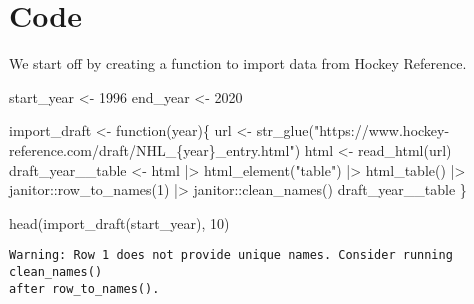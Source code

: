 \documentclass[
  letterpaper,
  DIV=11,
  numbers=noendperiod]{scrreprt}
\newenvironment{Shaded}{\begin{snugshade}}{\end{snugshade}}
\newcommand{\ControlFlowTok}[1]{\textcolor[rgb]{0.00,0.23,0.31}{#1}}
\newcommand{\DecValTok}[1]{\textcolor[rgb]{0.68,0.00,0.00}{#1}}
\newcommand{\FunctionTok}[1]{\textcolor[rgb]{0.28,0.35,0.67}{#1}}
\newcommand{\NormalTok}[1]{\textcolor[rgb]{0.00,0.23,0.31}{#1}}
\newcommand{\OtherTok}[1]{\textcolor[rgb]{0.00,0.23,0.31}{#1}}
\newcommand{\SpecialCharTok}[1]{\textcolor[rgb]{0.37,0.37,0.37}{#1}}
\newcommand{\StringTok}[1]{\textcolor[rgb]{0.13,0.47,0.30}{#1}}
\begin{document}

\chapter{Code}\label{code}

We start off by creating a function to import data from Hockey
Reference.

\begin{Shaded}
\begin{Highlighting}[]
\NormalTok{start\_year }\OtherTok{\textless{}{-}} \DecValTok{1996}
\NormalTok{end\_year }\OtherTok{\textless{}{-}} \DecValTok{2020}

\NormalTok{import\_draft }\OtherTok{\textless{}{-}} \ControlFlowTok{function}\NormalTok{(year)\{}
\NormalTok{  url }\OtherTok{\textless{}{-}} \FunctionTok{str\_glue}\NormalTok{(}\StringTok{"https://www.hockey{-}reference.com/draft/NHL\_\{year\}\_entry.html"}\NormalTok{)}
\NormalTok{  html }\OtherTok{\textless{}{-}} \FunctionTok{read\_html}\NormalTok{(url)}
\NormalTok{  draft\_year\_\_table }\OtherTok{\textless{}{-}}\NormalTok{ html }\SpecialCharTok{|\textgreater{}} 
    \FunctionTok{html\_element}\NormalTok{(}\StringTok{"table"}\NormalTok{) }\SpecialCharTok{|\textgreater{}} 
    \FunctionTok{html\_table}\NormalTok{() }\SpecialCharTok{|\textgreater{}} 
\NormalTok{    janitor}\SpecialCharTok{::}\FunctionTok{row\_to\_names}\NormalTok{(}\DecValTok{1}\NormalTok{) }\SpecialCharTok{|\textgreater{}} 
\NormalTok{    janitor}\SpecialCharTok{::}\FunctionTok{clean\_names}\NormalTok{()}
\NormalTok{  draft\_year\_\_table}
\NormalTok{\}}

\FunctionTok{head}\NormalTok{(}\FunctionTok{import\_draft}\NormalTok{(start\_year), }\DecValTok{10}\NormalTok{)}
\end{Highlighting}
\end{Shaded}

\begin{verbatim}
Warning: Row 1 does not provide unique names. Consider running clean_names()
after row_to_names().
\end{verbatim}
\end{document}
